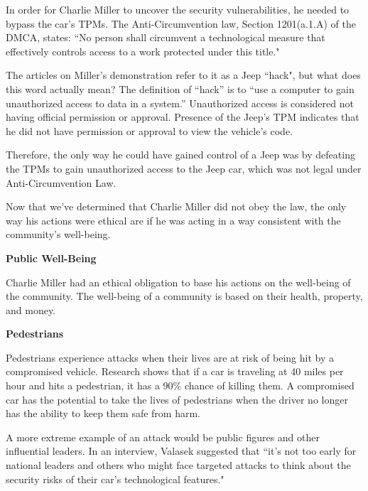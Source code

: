 \documentclass[12pt]{article}
\begin{document}
\begin{multicols}{2}
In order for Charlie Miller to uncover the security vulnerabilities, he needed to bypass the car's TPMs. \cite{brokeDMCA} The Anti-Circumvention law, Section 1201(a.1.A) of the DMCA, states: ``No person shall circumvent a technological measure that effectively controls access to a work protected under this title."\cite{DMCA}

The articles on Miller's demonstration refer to it as a Jeep ``hack", but what does this word actually mean? The definition of ``hack'' is to ``use a computer to gain unauthorized access to data in a system.''\cite{dictionary} Unauthorized access is considered not having official permission or approval. \cite{dictionary} Presence of the Jeep's TPM indicates that he did not have permission or approval to view the vehicle's code.

Therefore, the only way he could have gained control of a Jeep was by defeating the TPMs to gain unauthorized access to the Jeep car, which was not legal under Anti-Circumvention Law.\cite{DMCA}




Now that we've determined that Charlie Miller did not obey the law, the only way his actions were ethical are if he was acting in a way consistent with the community's well-being.

\vspace{.5cm}\hspace{-.5cm}\textbf{Public Well-Being}\vspace{.2cm}

Charlie Miller had an ethical obligation to base his actions on the well-being of the community. \cite{seCode} The well-being of a community is based on their health, property, and money.

\vspace{.2cm}\textbf{Pedestrians}

Pedestrians experience attacks when their lives are at risk of being hit by a compromised vehicle. Research shows that if a car is traveling at 40 miles per hour and hits a pedestrian, it has a 90\% chance of killing them.\cite{killSpeed} A compromised car has the potential to take the lives of pedestrians when the driver no longer has the ability to keep them safe from harm. 

A more extreme example of an attack would be public figures and other influential leaders. In an interview, Valasek suggested that ``it's not too early for national leaders and others who might face targeted attacks to think about the security risks of their car's technological features."\cite{hackingRisk}


\end{multicols}
\end{document}
